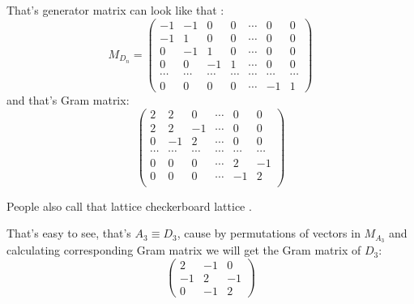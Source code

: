 \documentclass[a4paper, 12pt]{article}
\begin{document}
That's generator matrix can look like that :
$$
M_{D_n} = 
\begin{pmatrix}
	-1 & -1 & 0 & 0 & \cdots & 0 & 0 \\
	-1 & 1 & 0 & 0 & \cdots & 0 & 0 \\
	0 & -1 & 1 & 0 & \cdots & 0 & 0 \\
	0 & 0 & -1 & 1 & \cdots & 0 & 0 \\
	\cdots & \cdots & \cdots & \cdots & \cdots & \cdots & \cdots \\
	0 & 0 & 0 & 0 & \cdots & -1 & 1 
\end{pmatrix}
$$
and that's Gram matrix:
$$
\begin{pmatrix}
2 & 2 & 0 & \cdots & 0 & 0 \\
2 & 2 & -1 & \cdots & 0 & 0 \\
0 & -1 & 2 & \cdots & 0 & 0 \\
\cdots & \cdots & \cdots & \cdots & \cdots & \cdots \\
0 & 0 & 0 & \cdots & 2 & -1 \\
0 & 0 & 0 & \cdots & -1 & 2 \\ 
\end{pmatrix}
$$
\par People also call that lattice checkerboard lattice \cite{conway}.
\par That's easy to see, that's $A_3 \equiv D_3$, cause by permutations of vectors in $M_{A_3}$ and calculating corresponding Gram matrix we will get the Gram matrix of $D_3$:
$$
\begin{pmatrix}
	2 & -1 & 0 \\
	-1 & 2 & -1 \\
	0 & -1 & 2
\end{pmatrix}
$$
\end{document}
